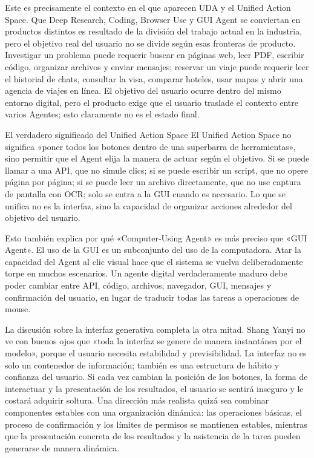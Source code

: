 \documentclass[a4paper]{article}
\begin{document}
Este es precisamente el contexto en el que aparecen UDA y el Unified Action Space. Que Deep Research, Coding, Browser Use y GUI Agent se conviertan en productos distintos es resultado de la división del trabajo actual en la industria, pero el objetivo real del usuario no se divide según esas fronteras de producto. Investigar un problema puede requerir buscar en páginas web, leer PDF, escribir código, organizar archivos y enviar mensajes; reservar un viaje puede requerir leer el historial de chats, consultar la visa, comparar hoteles, usar mapas y abrir una agencia de viajes en línea. El objetivo del usuario ocurre dentro del mismo entorno digital, pero el producto exige que el usuario traslade el contexto entre varios Agentes; esto claramente no es el estado final.

\begin{importantbox}{El verdadero significado del Unified Action Space}
El Unified Action Space no significa «poner todos los botones dentro de una superbarra de herramientas», sino permitir que el Agent elija la manera de actuar según el objetivo. Si se puede llamar a una API, que no simule clics; si se puede escribir un script, que no opere página por página; si se puede leer un archivo directamente, que no use captura de pantalla con OCR; solo se entra a la GUI cuando es necesario. Lo que se unifica no es la interfaz, sino la capacidad de organizar acciones alrededor del objetivo del usuario.
\end{importantbox}

Esto también explica por qué «Computer-Using Agent» es más preciso que «GUI Agent». El uso de la GUI es un subconjunto del uso de la computadora. Atar la capacidad del Agent al clic visual hace que el sistema se vuelva deliberadamente torpe en muchos escenarios. Un agente digital verdaderamente maduro debe poder cambiar entre API, código, archivos, navegador, GUI, mensajes y confirmación del usuario, en lugar de traducir todas las tareas a operaciones de mouse.

La discusión sobre la interfaz generativa completa la otra mitad. Shang Yanyi no ve con buenos ojos que «toda la interfaz se genere de manera instantánea por el modelo», porque el usuario necesita estabilidad y previsibilidad. La interfaz no es solo un contenedor de información; también es una estructura de hábito y confianza del usuario. Si cada vez cambian la posición de los botones, la forma de interactuar y la presentación de los resultados, el usuario se sentirá inseguro y le costará adquirir soltura. Una dirección más realista quizá sea combinar componentes estables con una organización dinámica: las operaciones básicas, el proceso de confirmación y los límites de permisos se mantienen estables, mientras que la presentación concreta de los resultados y la asistencia de la tarea pueden generarse de manera dinámica.
\end{document}

